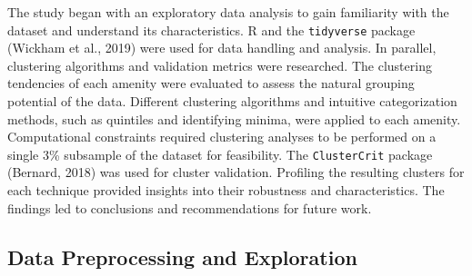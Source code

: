 \documentclass[11pt, a4paper]{article}
\begin{document}
The study began with an exploratory data analysis to gain familiarity with the dataset and understand its characteristics. R and the \texttt{tidyverse} package (Wickham et al., 2019) were used for data handling and analysis. In parallel, clustering algorithms and validation metrics were researched. The clustering tendencies of each amenity were evaluated to assess the natural grouping potential of the data. Different clustering algorithms and intuitive categorization methods, such as quintiles and identifying minima, were applied to each amenity. Computational constraints required clustering analyses to be performed on a single 3\% subsample of the dataset for feasibility. The \texttt{ClusterCrit} package (Bernard, 2018) was used for cluster validation. Profiling the resulting clusters for each technique provided insights into their robustness and characteristics. The findings led to conclusions and recommendations for future work.








\subsection{Data Preprocessing and Exploration}
\end{document}
